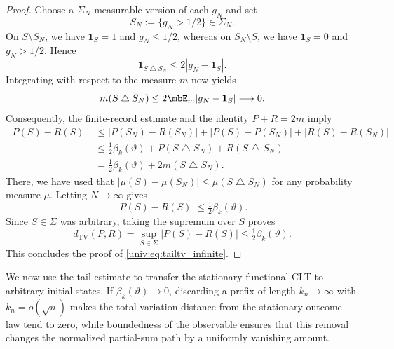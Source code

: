 \documentclass[a4paper]{article}
\numberwithin{equation}{section}   %
\theoremstyle{plain}   %
\theoremstyle{plain}   %
\theoremstyle{examplestyle}
\newcommand{\TV}{d_{\mathrm{TV}}}
\begin{document}
\begin{proof}
    Choose a $\Sigma_N$-measurable version of each $g_N$ and set
    \[
        S_N:=\{g_N>1/2\}\in\Sigma_N.
    \]
    On $S\setminus S_N$, we have $\mathbf1_S=1$ and $g_N\le1/2$, whereas on $S_N\setminus S$, we have $\mathbf1_S=0$ and $g_N>1/2$. 
    Hence
    \[
        \mathbf1_{S\mathbin\triangle S_N}
        \le2|g_N-\mathbf1_S|.
    \]
    Integrating with respect to the measure $m$ now yields
    \[
        m(S\mathbin\triangle S_N)
        \le2\mbE_m|g_N-\mathbf1_S|
        \longrightarrow0.
    \]
    Consequently, the finite-record estimate and the identity $P+R=2m$ imply
    \[
        \begin{aligned}
            |P(S)-R(S)|
            &\le
            |P(S_N)-R(S_N)|
            +|P(S)-P(S_N)|
            +|R(S)-R(S_N)|\\
            &\le
            \tfrac12\beta_k(\vartheta)
            +P(S\mathbin\triangle S_N)
            +R(S\mathbin\triangle S_N)\\
            &=
            \tfrac12\beta_k(\vartheta)
            +2m(S\mathbin\triangle S_N).
        \end{aligned}
    \]
    There, we have used that \(|\mu(S)-\mu(S_N)| \le\mu(S\mathbin\triangle S_N)\) for any probability measure $\mu$.
    Letting $N\to\infty$ gives
    \[
        |P(S)-R(S)|
        \le\tfrac12\beta_k(\vartheta).
    \]
    Since $S\in\Sigma$ was arbitrary, taking the supremum
    over $S$ proves
    \[
        \TV(P,R)
        =
        \sup_{S\in\Sigma}|P(S)-R(S)|
        \le\tfrac12\beta_k(\vartheta).
    \]
    This concludes the proof of \eqref{univ:eq:tailtv_infinite}.
\end{proof}  

We now use the tail estimate to transfer the stationary functional CLT to arbitrary initial states.
If $\beta_k(\vartheta)\to0$, discarding a prefix of length $k_n\to\infty$ with $k_n=o(\sqrt n)$ makes the total-variation distance from the stationary outcome law tend to zero, while boundedness of the observable ensures that this removal changes the normalized partial-sum path by a uniformly vanishing amount.
\end{document}
